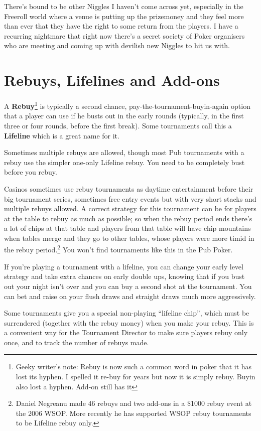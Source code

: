 There's bound to be other Niggles I haven't come across yet,
especially in the Freeroll world where a venue is putting up the
prizemoney and they feel more than ever that they have the right
to some return from the players. I have a recurring
nightmare that right now there's a secret society of Poker organisers
who are meeting and coming up with devilish new Niggles to hit us with.

\section{Rebuys, Lifelines and Add-ons}

A \textbf{Rebuy}\footnote{Geeky writer's note: Rebuy is now such a
  common word in poker that it has lost its hyphen. I spelled it
  re-buy for years but now it is simply rebuy. Buyin also lost a
  hyphen. Add-on still has it}
is typically a second chance, pay-the-tournament-buyin-again
option that a player can use if he busts out in the early rounds
(typically, in the first three or four rounds, before the first
break). Some tournaments call this a \textbf{Lifeline} which is a
great name for it.

Sometimes multiple rebuys are allowed, though most Pub tournaments
with a rebuy use the simpler one-only Lifeline rebuy. You
need to be completely bust before you rebuy.

Casinos sometimes use rebuy tournaments as daytime entertainment
before their big tournament series, sometimes free entry events
but with very short stacks and multiple rebuys allowed. A correct
strategy for this tournament can be for players at the table
to rebuy as much as possible; so when the rebuy period ends there's
a lot of chips at that table and players from that table will
have chip mountains when tables merge and they go to
other tables, whose players were more timid in the rebuy
period.\footnote{Daniel Negreanu made 46 rebuys and two add-ons
  in a \$1000 rebuy event at the 2006 WSOP. More recently he has
  supported WSOP rebuy tournaments to be Lifeline rebuy only.} You
won't find tournaments like this in the Pub Poker.

If you're playing a tournament with a lifeline, you can change
your early level strategy and take extra chances on early
double ups, knowing that if you bust out your night isn't over and
you can buy a second shot at the tournament. You can bet and raise
on your flush draws and straight draws much more aggressively.

Some tournaments give you a special non-playing ``lifeline chip'',
which must be surrendered (together with the rebuy money) when you
make your rebuy. This is a convenient way for the Tournament
Director to make sure players rebuy only once, and to track the number
of rebuys made.

